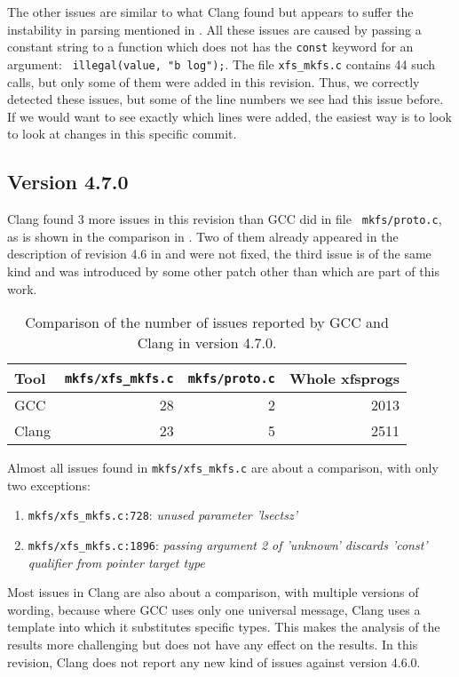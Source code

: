 The other issues are similar to what Clang found but appears to suffer the
instability in parsing mentioned in .
All these issues are caused by passing a constant string to a
function which does not has the {\tt const} keyword for an argument: {\tt
illegal(value, "b log");}. The file {\tt xfs\_mkfs.c} contains 44 such
calls, but only some of them were added in this revision. Thus, we correctly
detected these issues, but some of the line numbers we see had this issue
before. If we would want to see exactly which lines were added, the easiest way
is to look to look at changes in this specific commit.


\subsection{Version 4.7.0}\label{chap:results:gcc:4.7}

Clang found 3 more issues in this revision than GCC did in file {\tt
mkfs/proto.c}, as is shown in the comparison in . Two
of them already appeared in the description of revision 4.6 in
 and were not fixed, the third issue is of the same
kind and was introduced by some other patch other than which are part of this
work.

\begin{table}[h]
\begin{tabular}{|l||r|r||r|}
\hline
Tool & {\tt mkfs/xfs\_mkfs.c} & {\tt mkfs/proto.c} & Whole xfsprogs \\
\hline
GCC & 28 & 2 & 2013 \\
\hline
Clang & 23 & 5 & 2511 \\
\hline
\end{tabular}
\caption{Comparison of the number of issues reported by GCC and Clang in version
4.7.0.}
\label{tab:results:gcc:4.7}
\end{table}

Almost all issues found in {\tt mkfs/xfs\_mkfs.c} are about a comparison, with
only two exceptions:
\begin{enumerate}
	\item {\tt mkfs/xfs\_mkfs.c:728}: {\em unused parameter 'lsectsz'}
	\item {\tt mkfs/xfs\_mkfs.c:1896}: {\em passing argument 2 of 'unknown'
		discards 'const' qualifier from pointer target type}
\end{enumerate}


Most issues in Clang are also about a comparison, with multiple versions of
wording, because where GCC uses only one universal message, Clang uses a
template into which it substitutes specific types. This makes the analysis of
the results more challenging but does not have any effect on the results.
In this revision, Clang does not report any new kind of issues against version
4.6.0.

